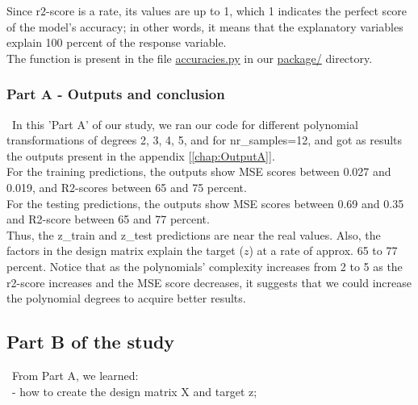 Since r2-score is a rate, its values are up to 1, which 1 indicates the perfect score of the model's accuracy; in other words, it means that the explanatory variables explain 100 percent of the response variable.\\

The function is present in the file \href{https://github.com/fabiorodp/UiO-FYS-STK4155/blob/master/Project1/package/accuracies.py}{accuracies.py} in our \href{https://github.com/fabiorodp/UiO-FYS-STK4155/tree/master/Project1/package}{package/} directory.\\

\subsubsection{Part A - Outputs and conclusion}
\label{chap:Part A - Outputs and conclusion}

\quad \, In this 'Part A' of our study, we ran our code for different polynomial transformations of degrees 2, 3, 4, 5, and for nr\_samples=12, and got as results the outputs present in the appendix [\autoref{chap:OutputA}].\\

For the training predictions, the outputs show MSE scores between 0.027 and 0.019, and R2-scores between 65 and 75 percent.\\

For the testing predictions, the outputs show MSE scores between 0.69 and 0.35 and R2-score between 65 and 77 percent.\\

Thus, the z\_train and z\_test predictions are near the real values. Also, the factors in the design matrix explain the target ($z$) at a rate of approx. 65 to 77 percent. Notice that as the polynomials' complexity increases from 2 to 5 as the r2-score increases and the MSE score decreases, it suggests that we could increase the polynomial degrees to acquire better results.\\

\subsection{Part B of the study}
\label{chap:Part B of the study}

\quad \, From Part A, we learned:\\

\quad \, - how to create the design matrix X and target z;\\ 

